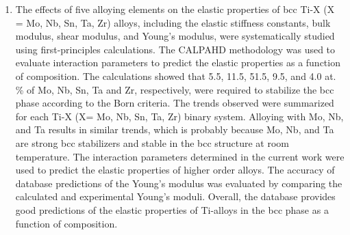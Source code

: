 \begin{enumerate}
	\item The effects of five alloying elements on the elastic properties of bcc Ti-X (X = Mo, Nb, Sn, Ta, Zr) alloys, including the elastic stiffness constants, bulk modulus, shear modulus, and Young's modulus, were systematically studied using first-principles calculations. The CALPAHD methodology was used to evaluate interaction parameters to predict the elastic properties as a function of composition. The calculations showed that 5.5, 11.5, 51.5, 9.5, and 4.0 at. \% of Mo, Nb, Sn, Ta and Zr, respectively, were required to stabilize the bcc phase according to the Born criteria. The trends observed were summarized for each Ti-X (X= Mo, Nb, Sn, Ta, Zr) binary system. Alloying with Mo, Nb, and Ta results in similar trends, which is probably because Mo, Nb, and Ta are strong bcc stabilizers and stable in the bcc structure at room temperature. The interaction parameters determined in the current work were used to predict the elastic properties of higher order alloys. The accuracy of database predictions of the Young’s modulus was evaluated by comparing the calculated and experimental Young's moduli. Overall, the database provides good predictions of the elastic properties of Ti-alloys in the bcc phase as a function of composition.

\end{enumerate}
